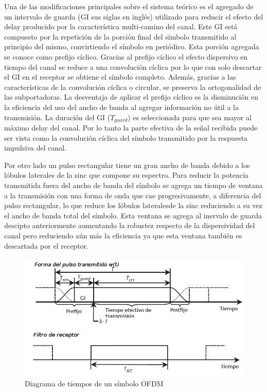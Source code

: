 Una de las modificaciones principales sobre el sistema teórico es el agregado de
un intervalo de guarda (GI sus siglas en inglés) utilizado para reducir el
efecto del delay producido por la característica multi-camino del canal. Este
GI está compuesto por la repetición de la porción final del símbolo transmitido
al principio del mismo, convirtiendo el símbolo en periódico. Esta porción
agregada se conoce como prefijo cíclico. Gracias al prefijo cíclico el efecto
dispersivo en tiempo del canal se reduce a una convolución cíclica por lo que
con solo descartar el GI en el receptor se obtiene el símbolo completo.
Además, gracias a las características de la convolución cíclica o circular, se
preserva la ortogonalidad de las subportadoras. La desventaja de aplicar el
prefijo cíclico es la disminución en la eficiencia del uso del ancho de banda
al agregar información no útil a la transmisión. La duración del GI
($T_{guard}$) es seleccionada para que sea mayor al máximo delay del canal. Por
lo tanto la parte efectiva de la señal recibida puede ser vista como la
convolución cíclica del símbolo transmitido por la respuesta impulsiva del
canal.

Por otro lado un pulso rectangular tiene un gran ancho de banda debido a los
lóbulos laterales de la sinc que compone su espectro. Para reducir la potencia
transmitida fuera del ancho de banda del símbolo se agrega un tiempo de ventana
a la transmisión con una forma de onda que cae progresivamente, a diferencia del
pulso rectangular, lo que reduce los lóbulos lateralesde la sinc reduciendo a su
vez el ancho de banda total del símbolo. Esta ventana se agrega al inervalo de
guarda descipto anteriormente aumentando la robustez respecto de la
dispersividad del canal pero reduciendo aún más la eficiencia ya que esta
ventana también es descartada por el receptor.

\begin{figure}[htb!]
        \centering
        \includegraphics[width=12cm]{./figures/symbol_T.png}
        \caption{Diagrama de tiempos de un símbolo OFDM}
        \label{fig:symbol_T}
\end{figure}

